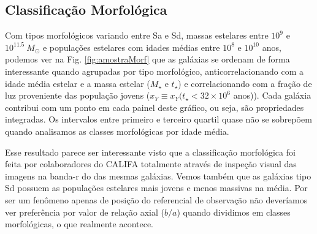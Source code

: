 \subsection{Classificação Morfológica}
\label{sec:amostra:morf}

Com tipos morfológicos variando entre Sa e Sd, massas estelares entre $10^9$ e $10^{11.5}\ M_\odot$
e populações estelares com idades médias entre $10^8$ e $10^{10}$ anos, podemos ver na Fig.
\ref{fig:amostraMorf} que as galáxias se ordenam de forma interessante quando agrupadas por tipo
morfológico, anticorrelacionando com a idade média estelar e a massa estelar ($M_\star$ e $t_\star$)
e correlacionando com a fração de luz proveniente das população jovens ($x_Y \equiv x_Y (t_\star <
32 \times 10^6$ anos)). Cada galáxia contribui com um ponto em cada painel deste gráfico, ou seja,
são propriedades integradas. Os intervalos entre primeiro e terceiro quartil quase não se sobrepõem
quando analisamos as classes morfológicas por idade média.

Esse resultado parece ser interessante visto que a classificação morfológica foi feita por
colaboradores do CALIFA totalmente através de inspeção visual das imagens na banda-r do \SDSS das
mesmas galáxias. Vemos também que as galáxias tipo Sd possuem as populações estelares mais jovens e
menos massivas na média. Por ser um fenômeno apenas de posição do referencial de observação não
deveríamos ver preferência por valor de relação axial ($b/a$) quando dividimos em classes
morfológicas, o que realmente acontece.

